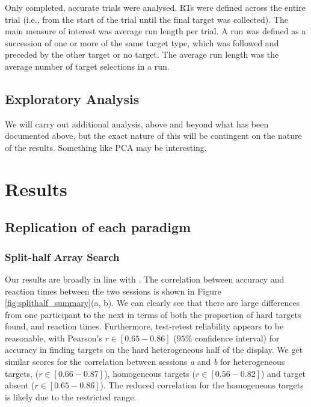 \documentclass[]{rsos}%
\begin{document}
Only completed, accurate trials were analysed. RTs were defined across the entire trial (i.e., from the start of the trial until the final target was collected). The main measure of interest was average run length per trial. A run was defined as a succession of one or more of the same target type, which was followed and preceded by the other target or no target. The average run length was the average number of target selections in a run. 

\subsection{Exploratory Analysis}

We will carry out additional analysis, above and beyond what has been documented above, but the exact nature of this will be contingent on the nature of the results. Something like PCA may be interesting. 

\section{Results}

\subsection{Replication of each paradigm}

\subsubsection{Split-half Array Search}
Our results are broadly in line with \cite{nowakowsak2017}. The correlation between accuracy and reaction times between the two sessions is shown in Figure \ref{fig:splithalf_summary}(a, b). We can clearly see that there are large differences from one participant to the next in terms of both the proportion of hard targets found, and reaction times. Furthermore, test-retest reliability appears to be reasonable, with Pearson's $r \in [0.65-0.86]$ ($95\%$ confidence interval) for accuracy in finding targets on the hard heterogeneous half of the display. We get similar scores for the correlation between sessions \textit{a} and \textit{b} for heterogeneous targets, ($r \in [0.66-0.87]$), homogeneous targets ($r \in [0.56-0.82]$) and target absent ($r \in [0.65-0.86]$). The reduced correlation for the homogeneous targets is likely due to the restricted range.
\end{document}
